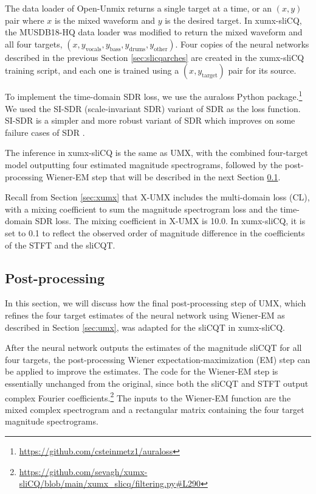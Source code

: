 \documentclass[report.tex]{subfiles}
\begin{document}
The data loader of Open-Unmix returns a single target at a time, or an $(x, y)$ pair where $x$ is the mixed waveform and $y$ is the desired target. In xumx-sliCQ, the MUSDB18-HQ data loader was modified to return the mixed waveform and all four targets, $(x, y_{\text{vocals}}, y_{\text{bass}}, y_{\text{drums}}, y_{\text{other}})$. Four copies of the neural networks described in the previous Section \ref{sec:slicqarches} are created in the xumx-sliCQ training script, and each one is trained using a $(x, y_{\text{target}})$ pair for its source.

To implement the time-domain SDR loss, we use the auraloss Python package.\footnote{\url{https://github.com/csteinmetz1/auraloss}} We used the SI-SDR (scale-invariant SDR) \parencite{roux2018sdr} variant of SDR as the loss function. SI-SDR is a simpler and more robust variant of SDR which improves on some failure cases of SDR \parencite{roux2018sdr}.

The inference in xumx-sliCQ is the same as UMX, with the combined four-target model outputting four estimated magnitude spectrograms, followed by the post-processing Wiener-EM step that will be described in the next Section \ref{sec:postprocessing}.

Recall from Section \ref{sec:xumx} that X-UMX includes the multi-domain loss (CL), with a mixing coefficient to sum the magnitude spectrogram loss and the time-domain SDR loss. The mixing coefficient in X-UMX is 10.0. In xumx-sliCQ, it is set to 0.1 to reflect the observed order of magnitude difference in the coefficients of the STFT and the sliCQT.

\newpagefill

\subsection{Post-processing}
\label{sec:postprocessing}

In this section, we will discuss how the final post-processing step of UMX, which refines the four target estimates of the neural network using Wiener-EM as described in Section \ref{sec:umx}, was adapted for the sliCQT in xumx-sliCQ.

After the neural network outputs the estimates of the magnitude sliCQT for all four targets, the post-processing Wiener expectation-maximization (EM) step can be applied to improve the estimates. The code for the Wiener-EM step is essentially unchanged from the original, since both the sliCQT and STFT output complex Fourier coefficients.\footnote{\url{https://github.com/sevagh/xumx-sliCQ/blob/main/xumx_slicq/filtering.py\#L290}} The inputs to the Wiener-EM function are the mixed complex spectrogram and a rectangular matrix containing the four target magnitude spectrograms.
\end{document}
